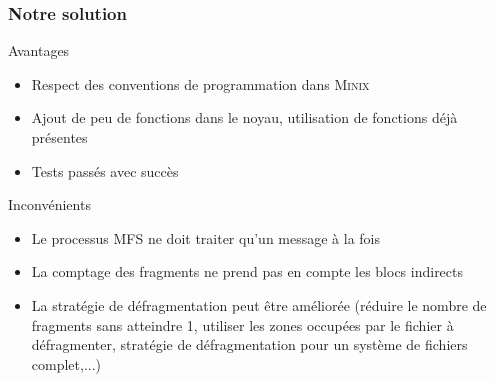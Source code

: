 \documentclass[handout]{beamer}
\begin{document}

\begin{frame}
\frametitle{Notre solution}
\begin{block}{Avantages}
\begin{itemize}
\item Respect des conventions de programmation dans \textsc{Minix}
\item Ajout de peu de fonctions dans le noyau, utilisation de fonctions déjà présentes
\item Tests passés avec succès
\end{itemize}
\end{block}
\begin{block}{Inconvénients}
\begin{itemize}
\item Le processus MFS ne doit traiter qu'un message à la fois
\item La comptage des fragments ne prend pas en compte les blocs indirects
\item La stratégie de défragmentation peut être améliorée (réduire le nombre de fragments sans atteindre 1, utiliser les zones occupées par le fichier à défragmenter, stratégie de défragmentation pour un système de fichiers complet,...)
\end{itemize}
\end{block}
\end{frame}

\end{document}
